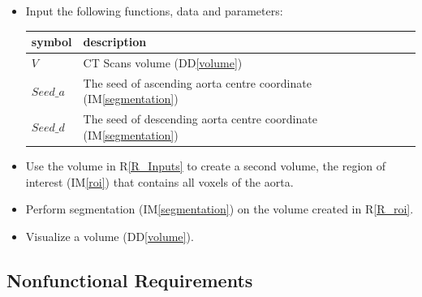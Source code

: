 \documentclass[12pt]{article}
\newcommand{\ddref}[1]{DD\ref{#1}}
\newcommand{\iref}[1]{IM\ref{#1}}
\newcounter{reqnum} %
\newcommand{\rref}[1]{R\ref{#1}}
\begin{document}
\noindent \begin{itemize}
\item[R\refstepcounter{reqnum}\thereqnum \label{R_Inputs}:] Input the following
  functions, data and parameters:
  \renewcommand{\arraystretch}{1.2}
  \noindent \begin{longtable*}{l l p{12cm}} \toprule
         \textbf{symbol}  & \textbf{description}\\
         \midrule 
$V$ & CT Scans volume
(\ddref{volume})\\ %
$Seed\_a$ & The seed of ascending aorta centre coordinate (\iref{segmentation})\\
$Seed\_d$ & The seed of descending aorta centre coordinate (\iref{segmentation})\\
         \bottomrule
\end{longtable*}

\item[R\refstepcounter{reqnum}\thereqnum \label{R_roi}:] Use the volume in \rref{R_Inputs} to create a second volume, the region of interest (\iref{roi}) that contains all voxels of the aorta.

\item[R\refstepcounter{reqnum}\thereqnum \label{R_output}:] Perform segmentation (\iref{segmentation}) on the volume created in \rref{R_roi}.

\item[R\refstepcounter{reqnum}\thereqnum \label{R_visualize}:] Visualize a volume (\ddref{volume}).

\end{itemize}

\subsection{Nonfunctional Requirements}
\end{document}

